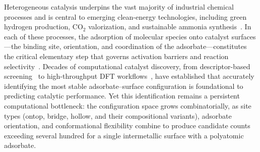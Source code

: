 

Heterogeneous catalysis underpins the vast majority of industrial chemical processes and is central to emerging clean-energy technologies, including green hydrogen production, CO$_2$ valorization, and sustainable ammonia synthesis~\cite{norskov2004density,greeley2017design}.
In each of these processes, the adsorption of molecular species onto catalyst surfaces---the binding site, orientation, and coordination of the adsorbate---constitutes the critical elementary step that governs activation barriers and reaction selectivity~\cite{norskov2004density}.
Decades of computational catalyst discovery, from descriptor-based screening~\cite{norskov2004density} to high-throughput DFT workflows~\cite{greeley2017design,ulissi2017toward}, have established that accurately identifying the most stable adsorbate--surface configuration is foundational to predicting catalytic performance.
Yet this identification remains a persistent computational bottleneck: the configuration space grows combinatorially, as site types (ontop, bridge, hollow, and their compositional variants), adsorbate orientation, and conformational flexibility combine to produce candidate counts exceeding several hundred for a single intermetallic surface with a polyatomic adsorbate. 

